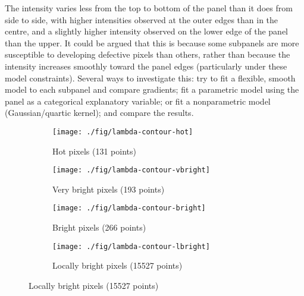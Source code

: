 \documentclass[10pt,fleqn]{article}
\begin{document}
The intensity varies less from the top to bottom of the panel than it does from side to side, with higher intensities observed at the outer edges than in the centre, and a slightly higher intensity observed on the lower edge of the panel than the upper. It could be argued that this is because some subpanels are more susceptible to developing defective pixels than others, rather than because the intensity increases smoothly toward the panel edges (particularly under these model constraints). Several ways to investigate this: try to fit a flexible, smooth model to each subpanel and compare gradients; fit a parametric model using the panel as a categorical explanatory variable; or fit a nonparametric model (Gaussian/quartic kernel); and compare the results.

\begin{figure}[!ht]
\centering
\caption{Log-linear Poisson processes fitted to each bad pixel type \emph{(Contours are labelled with $\lambda(x)$)}}

\begin{subfigure}[t]{0.49\textwidth}
\caption{Hot pixels (131 points)}
\texttt{[image: ./fig/lambda-contour-hot]}
\end{subfigure}
%
\begin{subfigure}[t]{0.49\textwidth}
\caption{Very bright pixels (193 points)}
\texttt{[image: ./fig/lambda-contour-vbright]}
\end{subfigure}

\vspace*{10pt}

\begin{subfigure}[t]{0.49\textwidth}
\caption{Bright pixels (266 points)}
\texttt{[image: ./fig/lambda-contour-bright]}
\end{subfigure}
%
\begin{subfigure}[t]{0.49\textwidth}
\caption{Locally bright pixels (15527 points)}
\texttt{[image: ./fig/lambda-contour-lbright]}
\end{subfigure}

\end{figure}


%
\end{document}
